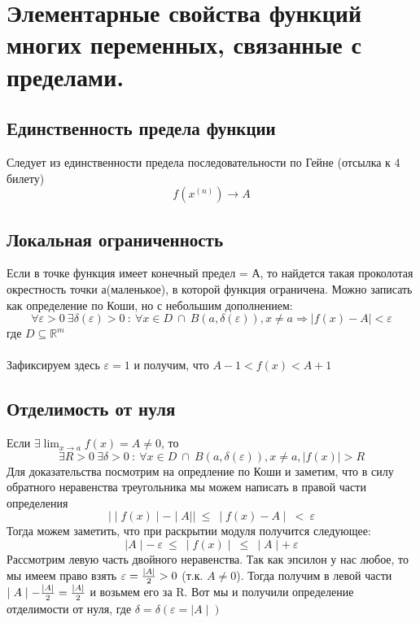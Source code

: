 \newcommand\R{\ensuremath{\mathbb{R}}}
\section{Элементарные свойства функций многих переменных, связанные с пределами.}

\subsection{Единственность предела функции}

Следует из единственности предела последовательности по Гейне 
(отсылка к 4 билету)
$$
f(x^{(n)}) \longrightarrow A
$$


\subsection{Локальная ограниченность}

Если в точке функция имеет конечный предел = А, то найдется 
такая проколотая окрестность точки а(маленькое), в которой функция 
ограничена. Можно записать как определение по Коши, но с небольшим 
дополнением:
$$
\forall \varepsilon > 0 \ \exists \delta(\varepsilon) > 0
\ : \ \forall x\in D \ \cap \ B(a,\delta(\varepsilon)), x\ne a
\Rightarrow \mid f(x) - A \mid < \varepsilon
$$
где $D \subseteq \R^m$
\\
\\
Зафиксируем здесь $\varepsilon = 1$ и получим, что 
$A-1<f(x)<A+1$


\subsection{Отделимость от нуля}

Если $\exists \lim_{x\to a}{f(x)} = A \ne 0$, то 
$$
\exists R>0 \ \exists \delta > 0 \ : \ \forall x\in D \ \cap \ 
B(a,\delta(\varepsilon)), x\ne a, \mid f(x) \mid > R
$$
Для доказательства посмотрим на опредление по Коши и заметим, что 
в силу обратного неравенства треугольника мы можем написать в 
правой части определения 
$$
\vert\mid f(x)\mid - \mid A\mid\vert \ \leq \ \mid f(x) - A\mid \ < \ \varepsilon
$$
Тогда можем заметить, что при раскрытии модуля получится следующее:
$$
\mid A\mid - \ \varepsilon \ \leq \ \mid f(x)\mid \ \leq \ \mid A\mid + \ \varepsilon
$$
Рассмотрим левую часть двойного неравенства. Так как эпсилон у нас любое, то мы имеем право взять 
$\varepsilon = {\mid A\mid\over2} > 0 \ $(т.к. $A\ne0$). Тогда получим в левой части
$\mid A\mid - {\mid A\mid\over2} = {\mid A\mid\over2}$ и возьмем его за R. Вот мы и получили
определение отделимости от нуля, где $\delta = \delta(\varepsilon = \mid A\mid)$


